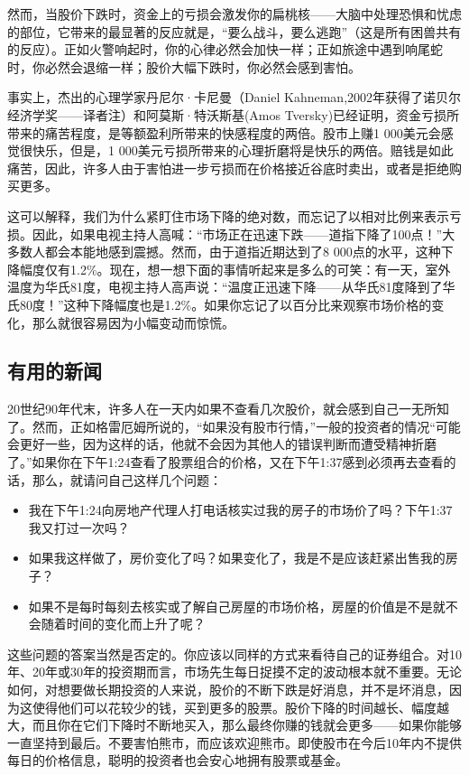 \documentclass[12pt,oneside]{book}
\begin{document}
然而，当股价下跌时，资金上的亏损会激发你的扁桃核——大脑中处理恐惧和忧虑的部位，它带来的最显著的反应就是，“要么战斗，要么逃跑”（这是所有困兽共有的反应）。正如火警响起时，你的心律必然会加快一样；正如旅途中遇到响尾蛇时，你必然会退缩一样；股价大幅下跌时，你必然会感到害怕。

事实上，杰出的心理学家丹尼尔·卡尼曼（Daniel Kahneman,2002年获得了诺贝尔经济学奖——译者注）和阿莫斯·特沃斯基(Amos Tversky)已经证明，资金亏损所带来的痛苦程度，是等额盈利所带来的快感程度的两倍。股市上赚1 000美元会感觉很快乐，但是，1 000美元亏损所带来的心理折磨将是快乐的两倍。赔钱是如此痛苦，因此，许多人由于害怕进一步亏损而在价格接近谷底时卖出，或者是拒绝购买更多。

这可以解释，我们为什么紧盯住市场下降的绝对数，而忘记了以相对比例来表示亏损。因此，如果电视主持人高喊：“市场正在迅速下跌——道指下降了100点！”大多数人都会本能地感到震撼。然而，由于道指近期达到了8 000点的水平，这种下降幅度仅有1.2\%。现在，想一想下面的事情听起来是多么的可笑：有一天，室外温度为华氏81度，电视主持人高声说：“温度正迅速下降——从华氏81度降到了华氏80度！”这种下降幅度也是1.2\%。如果你忘记了以百分比来观察市场价格的变化，那么就很容易因为小幅变动而惊慌。


\subsection{有用的新闻}
20世纪90年代末，许多人在一天内如果不查看几次股价，就会感到自己一无所知了。然而，正如格雷厄姆所说的，“如果没有股市行情，”一般的投资者的情况“可能会更好一些，因为这样的话，他就不会因为其他人的错误判断而遭受精神折磨了。”如果你在下午1:24查看了股票组合的价格，又在下午1:37感到必须再去查看的话，那么，就请问自己这样几个问题：

\begin{itemize}
\item 我在下午1:24向房地产代理人打电话核实过我的房子的市场价了吗？下午1:37我又打过一次吗？
\item 如果我这样做了，房价变化了吗？如果变化了，我是不是应该赶紧出售我的房子？
\item 如果不是每时每刻去核实或了解自己房屋的市场价格，房屋的价值是不是就不会随着时间的变化而上升了呢？
\end{itemize}

这些问题的答案当然是否定的。你应该以同样的方式来看待自己的证券组合。对10年、20年或30年的投资期而言，市场先生每日捉摸不定的波动根本就不重要。无论如何，对想要做长期投资的人来说，股价的不断下跌是好消息，并不是坏消息，因为这使得他们可以花较少的钱，买到更多的股票。股价下降的时间越长、幅度越大，而且你在它们下降时不断地买入，那么最终你赚的钱就会更多——如果你能够一直坚持到最后。不要害怕熊市，而应该欢迎熊市。即使股市在今后10年内不提供每日的价格信息，聪明的投资者也会安心地拥有股票或基金。
\end{document}
